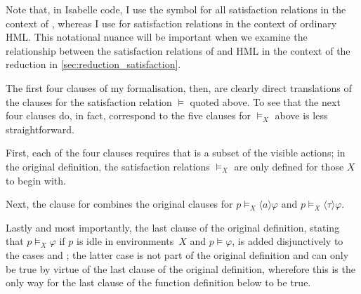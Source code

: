 \begin{isabellebody}
\begin{isamarkuptext}
Note that, in Isabelle code, I use the symbol \isa{{\isasymTTurnstile}} for all satisfaction relations in the context of \HMLt{}, whereas I use \isa{{\isasymTurnstile}} for satisfaction relations in the context of ordinary HML. 
This notational nuance will be important when we examine the relationship between the satisfaction relations of \HMLt{} and HML in the context of the reduction in \cref{sec:reduction_satisfaction}.

The first four clauses of my formalisation, then, are clearly direct translations of the clauses for the satisfaction relation $\vDash$ quoted above. To see that the next four clauses do, in fact, correspond to the five clauses for $\vDash_X$ above is less straightforward. 

First, each of the four clauses requires that  is a subset of the visible actions; in the original definition, the satisfaction relations $\vDash_X$ are only defined for those $X$ to begin with.

Next, the clause for  combines the original clauses for $p \vDash_X \langle a \rangle \varphi$ and $p \vDash_X \langle \tau \rangle \varphi$. 

Lastly and most importantly, the last clause of the original definition, stating that $p \vDash_X \varphi$ if $p$ is idle in environments~$X$ and $p \vDash \varphi$, is added disjunctively to the cases  and ; the latter case is not part of the original definition and can only be true by virtue of the last clause of the original definition, wherefore this is the only way for the last clause of the function definition below to be true. 


\end{isamarkuptext}
\end{isabellebody}
